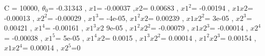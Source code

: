 \documentclass[11pt]{article} %
\begin{document}
 C = 10000, \(\theta_0\)= -0.31343 , \(x1\)= -0.00037 ,\(x2\)= 0.00683 , \(x1^2\)= -0.00194 , \(x1 x2\)= -0.00013 , \(x2^2\)= -0.00029 , \(x1^3\)= -4e-05, \(x1^2 x2\)= 0.00239 , \(x1 x2^2\)= 3e-05 , \(x2^3\)= 0.00421 , \(x1^4\)= -0.00161 , \(x1^3 x2\) 9e-05 , \(x1^2 x2^2\)= -0.00079 , \(x1 x2^3\)= -0.00014 , \(x2^4\)= -0.00038 , \(x1^5\)= 5e-05 , \(x1^4 x2\)= 0.0015 , \(x1^3 x2^2\)= 0.00014 , \(x1^2 x2^3\)= 0.00154 , \(x1 x2^4\)= 0.00014 , \(x2^5\)=0 \\\\

\newpage
 \begin{figure}[h]
\centering
{}
\qquad
{}
\qquad
{}

\end{figure}
\end{document}
